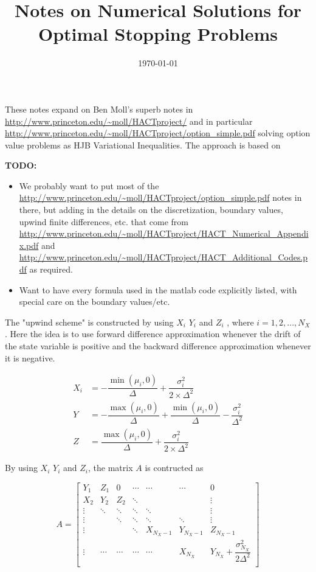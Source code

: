 \documentclass[11pt]{etk-article}
\begin{document}
\title{Notes on Numerical Solutions for Optimal Stopping Problems}
\date{\today}
\maketitle
These notes expand on Ben Moll's superb notes in \url{http://www.princeton.edu/~moll/HACTproject/} and in particular \url{http://www.princeton.edu/~moll/HACTproject/option_simple.pdf} solving option value problems as HJB Variational Inequalities.  The approach is based on \cite{HuangPang1998}

\textbf{TODO:}
\begin{itemize}
	\item We probably want to put most of the \url{http://www.princeton.edu/~moll/HACTproject/option_simple.pdf} notes in there, but adding in the details on the discretization, boundary values, upwind finite differences, etc. that come from \url{http://www.princeton.edu/~moll/HACTproject/HACT_Numerical_Appendix.pdf} and \url{http://www.princeton.edu/~moll/HACTproject/HACT_Additional_Codes.pdf} as required.
	\item Want to have every formula used in the matlab code explicitly listed, with special care on the boundary values/etc.
\end{itemize}

The "upwind scheme" is constructed by using $X_i$ $Y_i$ and $Z_i$ , where $i = 1, 2, ... , N_X$. Here the idea is to use forward difference approximation whenever the drift of the state variable is positive and the backward difference approximation whenever it is negative.

\begin{align}
	X_i &= - \dfrac{\min ( \mu_i , 0 )}{\Delta} + \dfrac{\sigma_i^{2}}{2 \times \Delta^{2}} \\
	Y &= - \dfrac{\max ( \mu_i , 0)}{\Delta} + \dfrac{\min ( \mu_i , 0)}{\Delta} - \dfrac{\sigma_i^{2}}{\Delta^{2}} \\
	Z &= \dfrac{\max ( \mu_i , 0)}{\Delta} + \dfrac{\sigma_i^{2}}{2\times \Delta^{2}}
\end{align}


By using $X_i$ $Y_i$ and $Z_i$, the matrix $A$ is contructed as 

\begin{equation}
A = \begin{bmatrix}
Y_1 & Z_1 & 0 & \cdots & \cdots & \cdots & 0 \\
X_2 & Y_2 & Z_2 & \ddots & & & \vdots \\
\vdots & \ddots & \ddots & \ddots & \ddots &  & \vdots \\
\vdots & &\ddots & \ddots & \ddots & \ddots  & \vdots \\
\vdots & & & \ddots & X_{N_X-1} & Y_{N_X-1}  & Z_{N_X-1} \\
\vdots & \cdots & \cdots & \cdots & \cdots & X_{N_X} & Y_{N_X}+\dfrac{\sigma_{N_X}^2}{2\Delta^2}\\
\end{bmatrix}
\end{equation}
\end{document}
